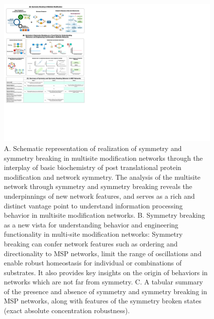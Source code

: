 \documentclass[9pt,lineno]{elife}
\begin{document}
\begin{figure}[h!]
\begin{fullwidth}
    \centering
    \includegraphics[angle = 0, height = 0.86\paperwidth, width = \paperwidth, keepaspectratio]{Fig04.pdf}
    \caption{A. Schematic representation of realization of symmetry and symmetry breaking in multisite modification networks through the interplay of basic biochemistry of post translational protein modification and network symmetry. The analysis of the multisite network through symmetry and symmetry breaking reveals the underpinnings of new network features, and serves as a rich and distinct vantage point to understand information processing behavior in multisite modification networks. B. Symmetry breaking as a new vista for understanding behavior and engineering functionality in multi-site modification networks: Symmetry breaking can confer network features such as ordering and directionality to MSP networks, limit the range of oscillations and enable robust homeostasis for individual or combinations of substrates.
    It also provides key insights on the origin of behaviors in networks which are not far from symmetry. C. A tabular summary of the presence and absence of symmetry and symmetry breaking in MSP networks, along with features of the symmetry broken states (exact absolute concentration robustness).}
    \label{Fig 4}
    \end{fullwidth}
\end{figure}
\end{document}
